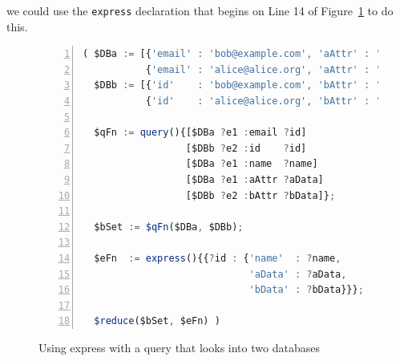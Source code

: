 \documentclass[10pt,letterpaper]{article} %
\newcommand{\stt}[1]{\texttt{#1}} %
\begin{document}
\hspace{-2em} we could use the \stt{express} declaration that begins on Line 14 of Figure~\ref{code:two-database-query-express} to do this.

\begin{figure}[H]
    \caption{Using express with a query that looks into two databases}
    \label{code:two-database-query-express}
\begin{lstlisting}[language=JavaScript,numberstyle=\scriptsize,basicstyle=\ttfamily\scriptsize,numbers=left,stepnumber=1,breaklines=true]
( $DBa := [{'email' : 'bob@example.com', 'aAttr' : 'Bob-A-data',   'name' : 'Bob'},
           {'email' : 'alice@alice.org', 'aAttr' : 'Alice-A-data', 'name' : 'Alice'}];
  $DBb := [{'id'    : 'bob@example.com', 'bAttr' : 'Bob-B-data'},
           {'id'    : 'alice@alice.org', 'bAttr' : 'Alice-B-data'}];

  $qFn := query(){[$DBa ?e1 :email ?id]
                  [$DBb ?e2 :id    ?id]
                  [$DBa ?e1 :name  ?name]
                  [$DBa ?e1 :aAttr ?aData]
                  [$DBb ?e2 :bAttr ?bData]};

  $bSet := $qFn($DBa, $DBb);

  $eFn  := express(){{?id : {'name'  : ?name,
                             'aData' : ?aData,
                             'bData' : ?bData}}};

  $reduce($bSet, $eFn) )
\end{lstlisting}
\end{figure} \vspace{-3em}
\end{document}
